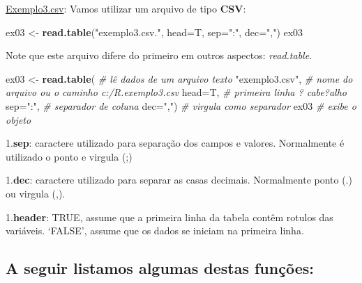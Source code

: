 \documentclass[
]{book}
\newenvironment{Shaded}{\begin{snugshade}}{\end{snugshade}}
\newcommand{\CommentTok}[1]{\textcolor[rgb]{0.56,0.35,0.01}{\textit{#1}}}
\newcommand{\DataTypeTok}[1]{\textcolor[rgb]{0.13,0.29,0.53}{#1}}
\newcommand{\KeywordTok}[1]{\textcolor[rgb]{0.13,0.29,0.53}{\textbf{#1}}}
\newcommand{\NormalTok}[1]{#1}
\newcommand{\StringTok}[1]{\textcolor[rgb]{0.31,0.60,0.02}{#1}}
\begin{document}
\href{https://www.dropbox.com/s/mv13cmkysw2nizm/exemplo3.csv?dl=1}{Exemplo3.csv}: Vamos utilizar um arquivo de tipo \textbf{CSV}:

\begin{Shaded}
\begin{Highlighting}[]
\NormalTok{ex03 <-}\StringTok{ }\KeywordTok{read.table}\NormalTok{(}\StringTok{"exemplo3.csv."}\NormalTok{, }\DataTypeTok{head=}\NormalTok{T, }\DataTypeTok{sep=}\StringTok{":"}\NormalTok{, }\DataTypeTok{dec=}\StringTok{","}\NormalTok{) }
\NormalTok{ex03}
\end{Highlighting}
\end{Shaded}

Note que este arquivo difere do primeiro em outros aspectos:
\emph{read.table.}

\begin{Shaded}
\begin{Highlighting}[]
\NormalTok{ex03 <-}\StringTok{ }\KeywordTok{read.table}\NormalTok{(       }\CommentTok{# lê dados de um arquivo texto}
  \StringTok{"exemplo3.csv"}\NormalTok{,         }\CommentTok{# nome do arquivo ou o caminho c:/R.exemplo3.csv}
  \DataTypeTok{head=}\NormalTok{T,                 }\CommentTok{# primeira linha ? cabe?alho}
  \DataTypeTok{sep=}\StringTok{":"}\NormalTok{,                }\CommentTok{# separador de coluna }
  \DataTypeTok{dec=}\StringTok{","}\NormalTok{)                }\CommentTok{# virgula como separador}
\NormalTok{ex03                      }\CommentTok{# exibe o objeto}
\end{Highlighting}
\end{Shaded}

1.\textbf{sep}: caractere utilizado para separação dos campos e valores. Normalmente é utilizado o ponto e virgula (;)

1.\textbf{dec}: caractere utilizado para separar as casas decimais. Normalmente ponto (.) ou virgula (,).

1.\textbf{header}: TRUE, assume que a primeira linha da tabela contêm rotulos das variáveis. `FALSE', assume que os dados se iniciam na primeira linha.

\hypertarget{a-seguir-listamos-algumas-destas-funuxe7uxf5es}{%
\subsection{A seguir listamos algumas destas funções:}\label{a-seguir-listamos-algumas-destas-funuxe7uxf5es}}
\end{document}
